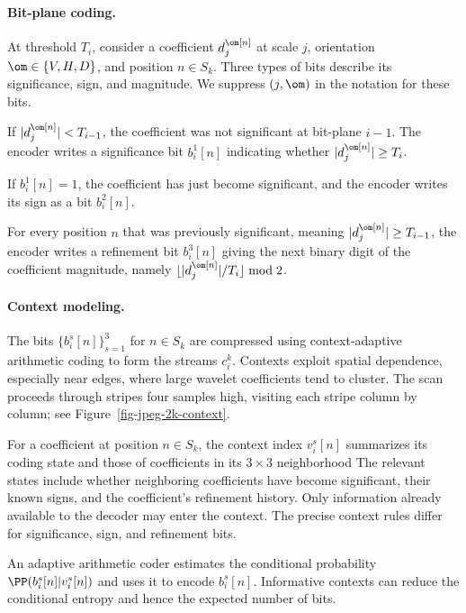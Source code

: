   
\paragraph{Bit-plane coding.}

At threshold $T_i$, consider a coefficient $d_j^\om[n]$ at scale $j$, orientation $\om\in\{V,H,D\}$, and position $n\in S_k$. Three types of bits describe its significance, sign, and magnitude. We suppress $(j,\om)$ in the notation for these bits.
\begin{rs}
	\item If $|d_j^\om[n]|<T_{i-1}$, the coefficient was not significant at bit-plane $i-1$. The encoder writes a significance bit
		$b_i^1[n]$ indicating whether $|d_j^\om[n]|\geq T_i$.
	\item If $b_i^1[n]=1$, the coefficient has just become significant, and the encoder writes its sign as a bit $b_i^2[n]$.
	\item For every position $n$ that was previously significant, meaning $|d_j^\om[n]|\geq T_{i-1}$, the encoder writes a refinement bit
		 $b_i^3[n]$ giving the next binary digit of the coefficient magnitude, namely $\lfloor|d_j^\om[n]|/T_i\rfloor\bmod2$.
\end{rs}

  
\paragraph{Context modeling.}

The bits $\{ b_i^s[n] \}_{s=1}^3$ for $n\in S_k$ are compressed using context-adaptive arithmetic coding to form the streams $c_i^k$. Contexts exploit spatial dependence, especially near edges, where large wavelet coefficients tend to cluster. The scan proceeds through stripes four samples high, visiting each stripe column by column; see Figure~\ref{fig-jpeg-2k-context}.



For a coefficient at position $n\in S_k$, the context index $v_i^s[n]$ summarizes its coding state and those of coefficients in its $3\times3$ neighborhood
The relevant states include whether neighboring coefficients have become significant, their known signs, and the coefficient's refinement history. Only information already available to the decoder may enter the context. The precise context rules differ for significance, sign, and refinement bits.

An adaptive arithmetic coder estimates the conditional probability $\PP( b_i^s[n] | v_i^s[n] )$ and uses it to encode $b_i^s[n]$. Informative contexts can reduce the conditional entropy and hence the expected number of bits.

